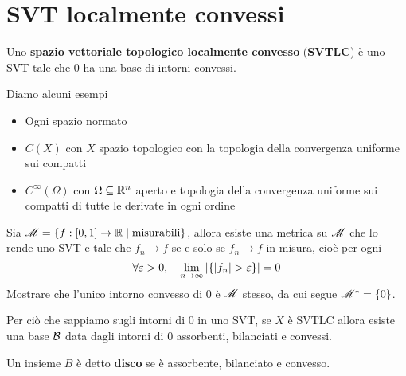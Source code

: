 \section{SVT localmente convessi}
\begin{definition}
Uno \textbf{spazio vettoriale topologico localmente convesso} (\textbf{SVTLC}) \`e uno SVT tale che $0$ ha una base di intorni convessi.
\end{definition}
\begin{example}
Diamo alcuni esempi
\begin{itemize}
    \item Ogni spazio normato
    \item $C(X)$ con $X$ spazio topologico con la topologia della convergenza uniforme sui compatti
    \item $C^\infty(\Omega)$ con $\Omega\subseteq \mathbb{R}^n$ aperto e topologia della convergenza uniforme sui compatti di tutte le derivate in ogni ordine
\end{itemize}
\end{example}

\begin{exercise}
Sia $\mathscr{M}=\left\{{f:[0,1]\to \mathbb{R}\mid \text{misurabili}}\right\}$, allora esiste una metrica su $\mathscr{M}$ che lo rende uno SVT e tale che $f_n\to f$ se e solo se $f_n\to f$ in misura, cio\`e per ogni 
\[\forall \e>0,\quad \lim_{n\to\infty}\abs{\cpa{\abs{f_n}>\e}}= 0\]
Mostrare che l'unico intorno convesso di $0$ \`e $\mathscr{M}$ stesso, da cui segue $\mathscr{M}^\ast=\left\{{0}\right\}$.
\end{exercise}

\begin{remark}
Per ci\`o che sappiamo sugli intorni di $0$ in uno SVT, se $X$ \`e SVTLC allora esiste una base $\mathcal{B}$ data dagli intorni di $0$ assorbenti, bilanciati e convessi.
\end{remark}

\begin{definition}[Disco]
Un insieme $B$ \`e detto \textbf{disco} se \`e assorbente, bilanciato e convesso.
\end{definition}

